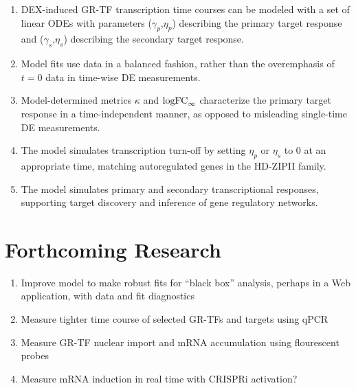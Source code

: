 \documentclass[aspb,landscape]{a0poster}
\begin{document}
\begin{multicols}{3}
  \begin{enumerate}
  \item DEX-induced GR-TF transcription time courses can be modeled with a set of linear ODEs with parameters ($\gamma_p$,$\eta_p$) describing the
    primary target response and ($\gamma_s$,$\eta_s$) describing the secondary target response.
  \item Model fits use data in a balanced fashion, rather than the overemphasis of $t=0$ data in time-wise DE measurements.
  \item Model-determined metrics $\kappa$ and ${\rm logFC}_\infty$ characterize the primary target response in a time-independent manner, as opposed to
    misleading single-time DE measurements.
  \item The model simulates transcription turn-off by setting $\eta_p$ or $\eta_s$ to 0 at an appropriate time, matching autoregulated genes in the HD-ZIPII family.
  \item The model simulates primary and secondary transcriptional responses, supporting target discovery and inference of gene regulatory networks.
  \end{enumerate}

  \color{Black}


  \section*{Forthcoming Research}

  \begin{enumerate}
  \item Improve model to make robust fits for ``black box'' analysis, perhaps in a Web application, with data and fit diagnostics
  \item Measure tighter time course of selected GR-TFs and targets using qPCR
  \item Measure GR-TF nuclear import and mRNA accumulation using flourescent probes
  \item Measure mRNA induction in real time with CRISPRi activation?
  \end{enumerate}



\end{multicols}
\end{document}
